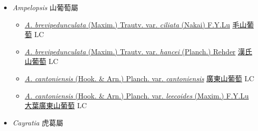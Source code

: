 
  \begin{itemize}
 \item[] \textit{Ampelopsis} 山葡萄屬
                    
  \begin{itemize}
        \item[] \href{http://www.theplantlist.org/tpl1.1/search?q=Ampelopsis+brevipedunculata+var.+ciliata}{\textit{A. brevipedunculata} (Maxim.) Trautv. var. \textit{ciliata} (Nakai) F.Y.Lu}   \href{\detokenize{http://taibnet.sinica.edu.tw/chi/taibnet_species_list.php?T2=毛山葡萄&T2_new_value=true&fr=y}}{毛山葡萄} LC
        \item[] \href{http://www.theplantlist.org/tpl1.1/search?q=Ampelopsis+brevipedunculata+var.+hancei}{\textit{A. brevipedunculata} (Maxim.) Trautv. var. \textit{hancei} (Planch.) Rehder}   \href{\detokenize{http://taibnet.sinica.edu.tw/chi/taibnet_species_list.php?T2=漢氏山葡萄&T2_new_value=true&fr=y}}{漢氏山葡萄} LC
        \item[] \href{http://www.theplantlist.org/tpl1.1/search?q=Ampelopsis+cantoniensis+var.+cantoniensis}{\textit{A. cantoniensis} (Hook. \& Arn.) Planch. var. \textit{cantoniensis}}   \href{\detokenize{http://taibnet.sinica.edu.tw/chi/taibnet_species_list.php?T2=廣東山葡萄&T2_new_value=true&fr=y}}{廣東山葡萄} LC
        \item[] \href{http://www.theplantlist.org/tpl1.1/search?q=Ampelopsis+cantoniensis+var.+leecoides}{\textit{A. cantoniensis} (Hook. \& Arn.) Planch. var. \textit{leecoides} (Maxim.) F.Y.Lu}   \href{\detokenize{http://taibnet.sinica.edu.tw/chi/taibnet_species_list.php?T2=大葉廣東山葡萄&T2_new_value=true&fr=y}}{大葉廣東山葡萄} LC
  \end{itemize}
 \item[] \textit{Cayratia} 虎葛屬
                    

\end{itemize}
